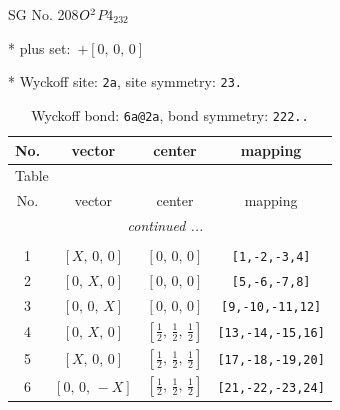 \documentclass[fleqn,8pt]{jsarticle}
\begin{document}
\setcounter{MaxMatrixCols}{32}

\renewcommand{\tablename}{Table~}
\renewcommand{\figurename}{Figure~}
\begin{center}
\LARGE
SG No. 208\quad$O_{\rm }^{2}$\quad$P4_232$\quad[ cubic ]
\end{center}

* plus set:\,\,\,$+\left[ 0,\, 0,\, 0 \right]$


* Wyckoff site: {\tt 2a}, site symmetry: {\tt 23.}
\renewcommand{\arraystretch}{1.2}
\begin{longtable}{cccc}
\caption{Wyckoff bond: {\tt 6a@2a}, bond symmetry: {\tt 222..}}
 \\
 \hline \hline
No. & vector & center & mapping \\ \hline \endfirsthead

\multicolumn{3}{l}{\tablename\ \thetable{}} \\
 \hline \hline
No. & vector & center & mapping \\ \hline \endhead

 \hline \hline
\multicolumn{3}{r}{\footnotesize\it continued ...} \\ \endfoot

 \hline \hline
\multicolumn{3}{r}{} \\ \endlastfoot

1 & $\left[ X,\, 0,\, 0 \right]$ & $\left[ 0,\, 0,\, 0 \right]$ & {\tt [1,-2,-3,4]} \\ \hline
2 & $\left[ 0,\, X,\, 0 \right]$ & $\left[ 0,\, 0,\, 0 \right]$ & {\tt [5,-6,-7,8]} \\ \hline
3 & $\left[ 0,\, 0,\, X \right]$ & $\left[ 0,\, 0,\, 0 \right]$ & {\tt [9,-10,-11,12]} \\ \hline
4 & $\left[ 0,\, X,\, 0 \right]$ & $\left[ \frac{1}{2},\, \frac{1}{2},\, \frac{1}{2} \right]$ & {\tt [13,-14,-15,16]} \\ \hline
5 & $\left[ X,\, 0,\, 0 \right]$ & $\left[ \frac{1}{2},\, \frac{1}{2},\, \frac{1}{2} \right]$ & {\tt [17,-18,-19,20]} \\ \hline
6 & $\left[ 0,\, 0,\, - X \right]$ & $\left[ \frac{1}{2},\, \frac{1}{2},\, \frac{1}{2} \right]$ & {\tt [21,-22,-23,24]} \\
\end{longtable}
\renewcommand{\arraystretch}{1.2}
\end{document}
